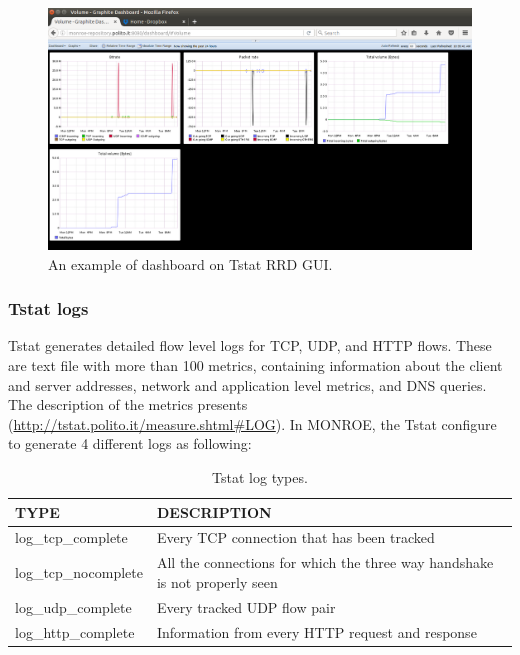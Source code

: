 \documentclass[a4paper,10pt]{article}
\begin{document}
\begin{figure}[h]
	\centering
	\includegraphics[width=1.0\textwidth]{TStatGraphitedashboard.png}
	\caption{An example of dashboard on Tstat RRD GUI.}
	\label{fig:TStatGraphitedashboard}
\end{figure}


\subsubsection{Tstat logs}
Tstat generates detailed flow level logs for TCP, UDP, and HTTP flows. These are text file with more than 100 metrics, containing information about the client and server addresses, network and application level metrics, and DNS queries. The description of the metrics presents (\url{http://tstat.polito.it/measure.shtml#LOG}).
In MONROE, the Tstat configure to generate 4 different logs as following:

\begin{table}[h]
	\caption{Tstat log types.}\label{tab:Tstatlogs}
	\begin{center}
	\begin{tabular}{ll}
		\toprule
		\textbf{TYPE} & \textbf{DESCRIPTION} \\
		\midrule
		log\_tcp\_complete & Every TCP connection that has been tracked \\
		log\_tcp\_nocomplete	& All the connections for which the three way handshake is not properly seen \\
		log\_udp\_complete & Every tracked UDP flow pair \\
		log\_http\_complete & Information from every HTTP request and response \\
			\bottomrule
	\end{tabular}
	\end{center}
\end{table}
    
\end{document}

